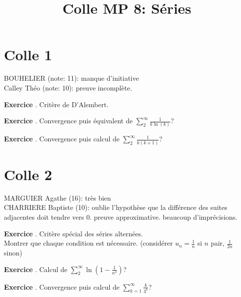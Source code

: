 \documentclass[10pt,a4paper]{article}
\title{Colle MP 8: Séries}
\newcounter{question}
\newcounter{exo}
\newenvironment{exo}{\vspace{0.5cm}\setcounter{question}{0}\addtocounter{exo}{1} \noindent \textbf{Exercice \theexo}. \normalsize }{\par}
\begin{document}
	\maketitle
	
	\section*{Colle 1}
	BOUHELIER (note: 11): manque d'initiative\\
	Calley Théo (note: 10): preuve incomplète.\\
		
	\begin{exo}
		Critère de D'Alembert.
	\end{exo}
	
	\begin{exo}
		Convergence puis équivalent de $\sum_{2}^{\infty} \frac{1}{k\ln(k)}$? 
	\end{exo}

	\begin{exo}
		Convergence puis calcul de $\sum_{2}^{\infty} \frac{1}{k(k+1)}$? 
	\end{exo}
	
	\section*{Colle 2}
	\setcounter{exo}{0}
	MARGUIER Agathe (16): très bien\\
	CHARRIERE Baptiste (10): oublie l'hypothèse que la différence des suites adjacentes doit tendre vers 0. preuve approximative. beaucoup d'imprécisions.
	
	\begin{exo}
		Critère spécial des séries alternées.\\
		Montrer que chaque condition est nécessaire. (considérer $u_n = \frac{1}{n}$ si $n$ pair, $\frac{1}{2n}$ sinon)
	\end{exo}

	\begin{exo}
		Calcul de $\sum_{2}^{\infty} \ln(1 - \frac{1}{n^2})$? 
	\end{exo}
	
	\begin{exo}
		Convergence puis calcul de $\sum_{k=1}^{\infty} \frac{k}{3^k}$?
	\end{exo}
	
\end{document}
